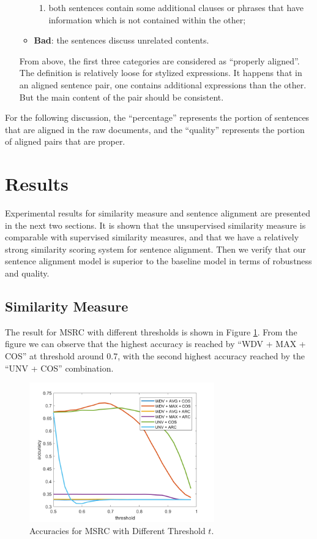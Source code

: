 \begin{enumerate}
\begin{itemize}
\begin{enumerate}
			\item both sentences contain some additional clauses or phrases that have information which is not contained within the other;
		\end{enumerate}
		\item \textbf{Bad}: the sentences discuss unrelated contents.
	\end{itemize}
	From above, the first three categories are considered as ``properly aligned''. The definition is relatively loose for stylized expressions. It happens that in an aligned sentence pair, one contains additional expressions than the other. But the main content of the pair should be consistent.
\end{enumerate}

For the following discussion, the ``percentage'' represents the portion of sentences that are aligned in the raw documents, and the ``quality'' represents the portion of aligned pairs that are proper.

\section{Results}
\label{sec:results}

Experimental results for similarity measure and sentence alignment are presented in the next two sections. It is shown that the unsupervised similarity measure is comparable with supervised similarity measures, and that we have a relatively strong similarity scoring system for sentence alignment. Then we verify that our sentence alignment model is superior to the baseline model in terms of robustness and quality.

\subsection{Similarity Measure}
The result for MSRC with different thresholds is shown in Figure \ref{fig:5}. From the figure we can observe that the highest accuracy is reached by ``WDV + MAX + COS'' at threshold around 0.7, with the second highest accuracy reached by the ``UNV + COS'' combination. 

\begin{figure}[htbp]
	\centering
	\includegraphics[width=8cm]{./5.png}
	\caption{Accuracies for MSRC with Different Threshold $t$.}\label{fig:5}
\end{figure}

